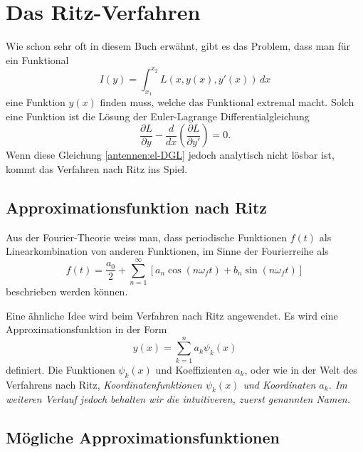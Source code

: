%
%
% 
%
%

\section{Das Ritz-Verfahren\label{antennen:ritzGrundsätzlich}}

Wie schon sehr oft in diesem Buch erwähnt, gibt es das Problem, dass man für ein Funktional
\begin{equation}
I(y)
=
\int_{x_1}^{x_2}L(x,y(x),y'(x))\,dx
\label{antennen:normalesFunktional}
\end{equation}
eine Funktion $y(x)$ finden muss, welche das Funktional extremal macht.
Solch eine Funktion ist die Lösung der Euler-Lagrange Differentialgleichung
\begin{equation}
\frac{\partial L}{\partial y} - \frac{d}{dx} \left( \frac{\partial L}{\partial y'} \right) = 0.
\label{antennen:el-DGL}
\end{equation}
Wenn diese Gleichung \eqref{antennen:el-DGL} 
jedoch analytisch nicht lösbar ist, kommt das Verfahren nach Ritz ins Spiel.

\subsection{Approximationsfunktion nach Ritz\label{antennen:approxFunkt}}

Aus der Fourier-Theorie weiss man, dass
periodische Funktionen $f(t)$ als Linearkombination von anderen Funktionen, 
im Sinne der Fourierreihe als
\begin{equation}
f(t)
=
\frac{a_0}{2}+\sum_{n=1}^{\infty}[a_n\cos(n \omega_f t )+b_n\sin(n \omega_f t)]
\label{antennen:fourier}
\end{equation}
beschrieben werden können.

Eine ähnliche Idee wird beim Verfahren nach Ritz angewendet.
Es wird eine Approximationsfunktion in der Form
\begin{equation}
y(x)=\sum_{k=1}^n a_k \psi_k(x)
\label{antennen:ritzFunkt}
\end{equation}
definiert. Die Funktionen $\psi_k(x)$ und Koeffizienten $a_k$, oder
wie in der Welt des Verfahrens nach Ritz,  
\em Koordinatenfunktionen $\psi_k(x)$ \em und \em Koordinaten \em $a_k$.
Im weiteren Verlauf jedoch behalten wir die intuitiveren, zuerst genannten Namen.

\subsection{Mögliche Approximationsfunktionen\label{antennen:approxBsp}}

